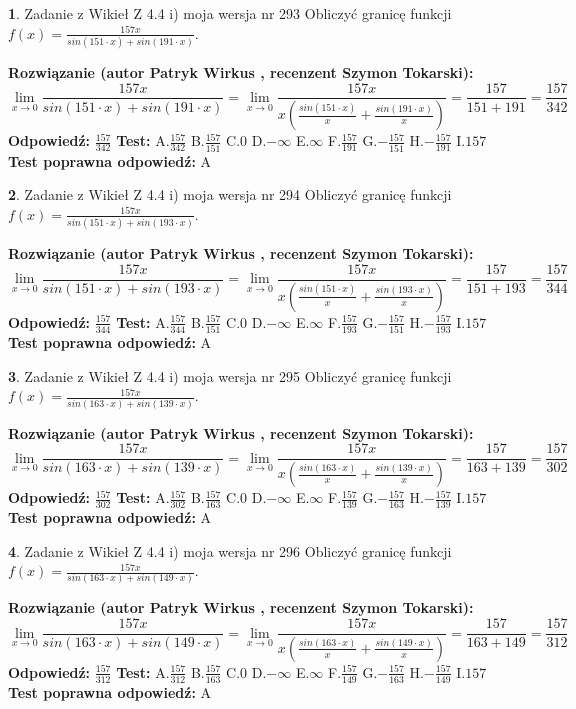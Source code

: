 \documentclass[12pt, a4paper]{article}
\theoremstyle{definition} %
\newtheorem{zad}{}
\newcommand{\zadStart}[1]{\begin{zad}#1\newline}
\newcommand{\zadStop}{\end{zad}}
\newcommand{\rozwStart}[2]{\noindent \textbf{Rozwiązanie (autor #1 , recenzent #2): }\newline}
\newcommand{\rozwStop}{\newline}
\newcommand{\odpStart}{\noindent \textbf{Odpowiedź:}\newline}
\newcommand{\odpStop}{\newline}
\newcommand{\testStart}{\noindent \textbf{Test:}\newline}
\newcommand{\testStop}{\newline}
\newcommand{\kluczStart}{\noindent \textbf{Test poprawna odpowiedź:}\newline}
\newcommand{\kluczStop}{\newline}
\begin{document}
\zadStart{Zadanie z Wikieł Z 4.4 i) moja wersja nr 293}
Obliczyć granicę funkcji $f(x)=\frac{157x}{sin(151\cdot x) +sin(191\cdot x)}$.
\zadStop
\rozwStart{Patryk Wirkus}{Szymon Tokarski}
$$\lim\limits_{x\to 0}\frac{157x}{sin(151\cdot x) +sin(191\cdot x)}=\lim\limits_{x\to 0}\frac{157x}{x(\frac{sin(151\cdot x)}{x}+\frac{sin(191\cdot x)}{x})}=\frac{157}{151+191} = \frac{157}{342}$$
\rozwStop
\odpStart
$\frac{157}{342}$
\odpStop
\testStart
A.$\frac{157}{342}$
B.$\frac{157}{151}$
C.$0$
D.$-\infty$
E.$\infty$
F.$\frac{157}{191}$
G.$-\frac{157}{151}$
H.$-\frac{157}{191}$
I.$157$
\testStop
\kluczStart
A
\kluczStop



\zadStart{Zadanie z Wikieł Z 4.4 i) moja wersja nr 294}
Obliczyć granicę funkcji $f(x)=\frac{157x}{sin(151\cdot x) +sin(193\cdot x)}$.
\zadStop
\rozwStart{Patryk Wirkus}{Szymon Tokarski}
$$\lim\limits_{x\to 0}\frac{157x}{sin(151\cdot x) +sin(193\cdot x)}=\lim\limits_{x\to 0}\frac{157x}{x(\frac{sin(151\cdot x)}{x}+\frac{sin(193\cdot x)}{x})}=\frac{157}{151+193} = \frac{157}{344}$$
\rozwStop
\odpStart
$\frac{157}{344}$
\odpStop
\testStart
A.$\frac{157}{344}$
B.$\frac{157}{151}$
C.$0$
D.$-\infty$
E.$\infty$
F.$\frac{157}{193}$
G.$-\frac{157}{151}$
H.$-\frac{157}{193}$
I.$157$
\testStop
\kluczStart
A
\kluczStop



\zadStart{Zadanie z Wikieł Z 4.4 i) moja wersja nr 295}
Obliczyć granicę funkcji $f(x)=\frac{157x}{sin(163\cdot x) +sin(139\cdot x)}$.
\zadStop
\rozwStart{Patryk Wirkus}{Szymon Tokarski}
$$\lim\limits_{x\to 0}\frac{157x}{sin(163\cdot x) +sin(139\cdot x)}=\lim\limits_{x\to 0}\frac{157x}{x(\frac{sin(163\cdot x)}{x}+\frac{sin(139\cdot x)}{x})}=\frac{157}{163+139} = \frac{157}{302}$$
\rozwStop
\odpStart
$\frac{157}{302}$
\odpStop
\testStart
A.$\frac{157}{302}$
B.$\frac{157}{163}$
C.$0$
D.$-\infty$
E.$\infty$
F.$\frac{157}{139}$
G.$-\frac{157}{163}$
H.$-\frac{157}{139}$
I.$157$
\testStop
\kluczStart
A
\kluczStop



\zadStart{Zadanie z Wikieł Z 4.4 i) moja wersja nr 296}
Obliczyć granicę funkcji $f(x)=\frac{157x}{sin(163\cdot x) +sin(149\cdot x)}$.
\zadStop
\rozwStart{Patryk Wirkus}{Szymon Tokarski}
$$\lim\limits_{x\to 0}\frac{157x}{sin(163\cdot x) +sin(149\cdot x)}=\lim\limits_{x\to 0}\frac{157x}{x(\frac{sin(163\cdot x)}{x}+\frac{sin(149\cdot x)}{x})}=\frac{157}{163+149} = \frac{157}{312}$$
\rozwStop
\odpStart
$\frac{157}{312}$
\odpStop
\testStart
A.$\frac{157}{312}$
B.$\frac{157}{163}$
C.$0$
D.$-\infty$
E.$\infty$
F.$\frac{157}{149}$
G.$-\frac{157}{163}$
H.$-\frac{157}{149}$
I.$157$
\testStop
\kluczStart
A
\kluczStop
\end{document}
